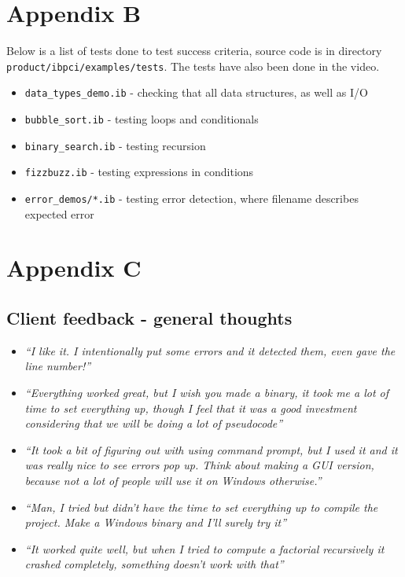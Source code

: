 \documentclass{article}
\begin{document}
\section{Appendix B}

    Below is a list of tests done to test success criteria, source code is in 
    directory \texttt{product/ibpci/examples/tests}. The tests have also been done
    in the video.
    \begin{itemize}
        \item \texttt{data\_types\_demo.ib} - checking that all data structures,
            as well as I/O 
        \item \texttt{bubble\_sort.ib} - testing loops and conditionals
        \item \texttt{binary\_search.ib} - testing recursion
        \item \texttt{fizzbuzz.ib} - testing expressions in conditions
        \item \texttt{error\_demos/*.ib} - testing error detection, where filename
            describes expected error
    \end{itemize}


\section{Appendix C}

\subsection{Client feedback - general thoughts}

    \begin{itemize}
        \item \textit{``I like it. I intentionally put some errors and it
            detected them, even gave the line number!''}
        \item \textit{``Everything worked great, but I wish you made a binary,
            it took me a lot of time to set everything up, though I feel that
            it was a good investment considering that we will be doing a lot
            of pseudocode''}
        \item \textit{``It took a bit of figuring out with using command prompt,
            but I used it and it was really nice to see errors pop up. Think
            about making a GUI version, because not a lot of people will use
            it on Windows otherwise.''}
        \item \textit{``Man, I tried but didn't have the time to set everything
            up to compile the project. Make a Windows binary and I'll surely try
            it''}
        \item \textit{``It worked quite well, but when I tried to compute a factorial
            recursively it crashed completely, something doesn't work with that''}
    \end{itemize}
\end{document}
